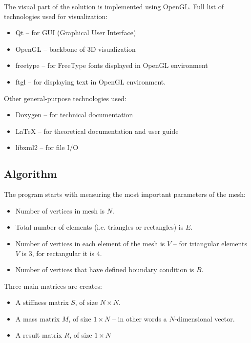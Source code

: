 \documentclass[a4paper,12pt]{article}
\begin{document}
The visual part of the solution is implemented using OpenGL. Full list of technologies used for visualization:

\begin{itemize}
  \item Qt -- for GUI (Graphical User Interface)
  \item OpenGL -- backbone of 3D visualization
  \item freetype -- for FreeType fonts displayed in OpenGL environment
  \item ftgl -- for displaying text in OpenGL environment.
\end{itemize}

Other general-purpose technologies used:

\begin{itemize}
  \item Doxygen -- for technical documentation
  \item LaTeX -- for theoretical documentation and user guide
  \item libxml2 -- for file I/O
\end{itemize}

\subsection{Algorithm}

The program starts with measuring the most important parameters of the mesh:

\begin{itemize}

  \item Number of vertices in mesh is $N$.

  \item Total number of elements (i.e. triangles or rectangles) is $E$.

  \item Number of vertices in each element of the mesh is $V$ -- for triangular elements $V$ is $3$, for rectangular it
  is $4$.

  \item Number of vertices that have defined boundary condition is $B$.

\end{itemize}

Three main matrices are creates:

\begin{itemize}

  \item A stiffness matrix $S$, of size $N \times N$.

  \item A mass matrix $M$, of size $1 \times N$ -- in other words a $N$-dimensional vector.

  \item A result matrix $R$, of size $1 \times N$

\end{itemize}
\end{document}
